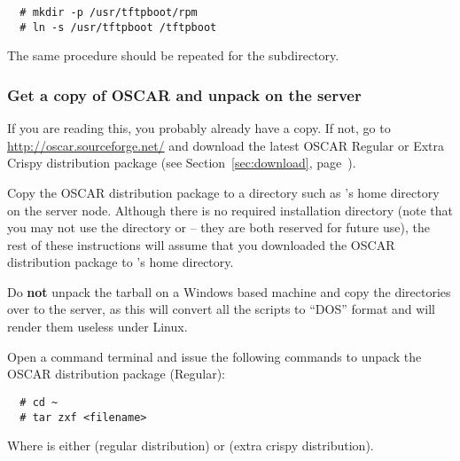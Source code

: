 \begin{verbatim}
  # mkdir -p /usr/tftpboot/rpm
  # ln -s /usr/tftpboot /tftpboot
\end{verbatim}

The same procedure should be repeated for the
 subdirectory.

    
\subsubsection{Get a copy of OSCAR and unpack on the server} 
\label{det:unpack}

If you are reading this, you probably already have a copy. If not, go
to \url{http://oscar.sourceforge.net/} and download the latest OSCAR
Regular or Extra Crispy distribution package (see
Section~\ref{sec:download}, page~\pageref{sec:download}).

Copy the OSCAR distribution package to a directory such as
's home directory on the server node.  Although there is no
required installation directory (note that you may not use the
directory  or  -- they are
both reserved for future use), the rest of these instructions will
assume that you downloaded the OSCAR distribution package to
's home directory.

Do {\bf not} unpack the tarball on a Windows based machine and copy
the directories over to the server, as this will convert all the
scripts to ``DOS'' format and will render them useless under Linux.

Open a command terminal and issue the following commands to unpack the
OSCAR distribution package (Regular):

\begin{verbatim}
  # cd ~
  # tar zxf <filename>
\end{verbatim}

Where  is either
 (regular distribution) or
 (extra crispy
distribution).

\def\obase{$^\sim$/oscar-\oscarversion}

